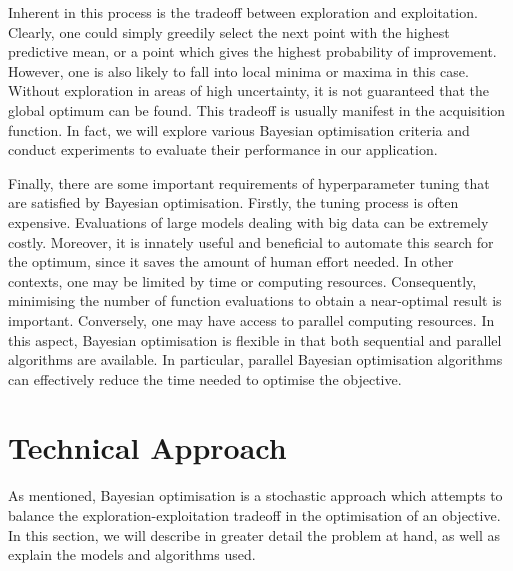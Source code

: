 \documentclass[letterpaper]{article}
\begin{document}
Inherent in this process is the tradeoff between exploration and exploitation.
Clearly, one could simply greedily select the next point with the highest predictive
mean, or a point which gives the highest probability of improvement. However, one
is also likely to fall into local minima or maxima in this case. Without exploration
in areas of high uncertainty, it is not guaranteed that the global optimum can be
found. This tradeoff is usually manifest in the acquisition function. In fact,
we will explore various Bayesian optimisation criteria and conduct experiments to
evaluate their performance in our application.

Finally, there are some important requirements of hyperparameter tuning that are satisfied
by Bayesian optimisation. Firstly, the tuning process is often expensive.
Evaluations of large models dealing with big data can be extremely costly.
Moreover, it is innately useful and beneficial to automate this search for the
optimum, since it saves the amount of human effort needed. In other contexts,
one may be limited by time or computing resources. Consequently, minimising the
number of function evaluations to obtain a near-optimal result is important.
Conversely, one may have access to parallel computing resources. In this aspect,
Bayesian optimisation is flexible in that both sequential and parallel algorithms
are available. In particular, parallel Bayesian optimisation
algorithms can effectively reduce the time needed to optimise the objective.

\section{Technical Approach}
As mentioned, Bayesian optimisation is a stochastic approach which attempts to
balance the exploration-exploitation tradeoff in the optimisation of an objective.
In this section, we will describe in greater detail the problem at hand, as well
as explain the models and algorithms used.
\end{document}
